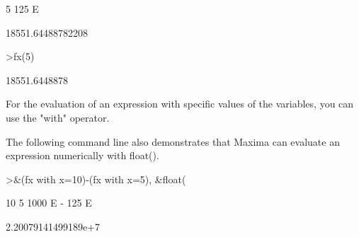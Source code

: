 \documentclass{article}
\begin{document}
\begin{eulernotebook}
\begin{eulercomment}
\begin{eulercomment}
\begin{euleroutput}
                                       5
                                  125 E
  
  
                            18551.64488782208
  
\end{euleroutput}
\begin{eulerprompt}
>fx(5)
\end{eulerprompt}
\begin{euleroutput}
  18551.6448878
\end{euleroutput}
\begin{eulercomment}
For the evaluation of an expression with specific values of the variables,
you can use the "with" operator.

The following command line also demonstrates that Maxima can evaluate an
expression numerically with float().
\end{eulercomment}
\begin{eulerprompt}
>&(fx with x=10)-(fx with x=5), &float(%
\end{eulerprompt}
\begin{euleroutput}
  
                                  10        5
                            1000 E   - 125 E
  
  
                           2.20079141499189e+7
  

\end{euleroutput}
\end{eulercomment}
\end{eulercomment}
\end{eulernotebook}
\end{document}
